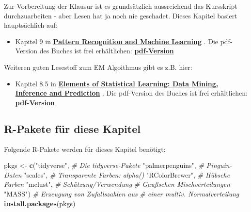 \documentclass[
  ngerman,
]{book}
\newenvironment{Shaded}{\begin{snugshade}}{\end{snugshade}}
\newcommand{\CommentTok}[1]{\textcolor[rgb]{0.56,0.35,0.01}{\textit{#1}}}
\newcommand{\KeywordTok}[1]{\textcolor[rgb]{0.13,0.29,0.53}{\textbf{#1}}}
\newcommand{\NormalTok}[1]{#1}
\newcommand{\StringTok}[1]{\textcolor[rgb]{0.31,0.60,0.02}{#1}}
\providecommand{\tightlist}{%
  \setlength{\itemsep}{0pt}\setlength{\parskip}{0pt}}
\begin{document}
Zur Vorbereitung der Klausur ist es grundsätzlich aussreichend das Kursskript durchzuarbeiten - aber Lesen hat ja noch nie geschadet. Dieses Kapitel basiert hauptsächlich auf:

\begin{itemize}
\tightlist
\item
  Kapitel 9 in \href{https://www.microsoft.com/en-us/research/uploads/prod/2006/01/Bishop-Pattern-Recognition-and-Machine-Learning-2006.pdf}{\textbf{Pattern Recognition and Machine Learning}} \citep{book_Bishop2006}.
  Die pdf-Version des Buches ist frei erhältlichen: \href{https://www.microsoft.com/en-us/research/uploads/prod/2006/01/Bishop-Pattern-Recognition-and-Machine-Learning-2006.pdf}{\textbf{pdf-Version}}
\end{itemize}

Weiteren guten Lesestoff zum EM Algoithmus gibt es z.B. hier:

\begin{itemize}
\tightlist
\item
  Kapitel 8.5 in \href{https://web.stanford.edu/~hastie/ElemStatLearn/}{\textbf{Elements of Statistical Learning: Data Mining, Inference and Prediction}} \citep{Elements}.
  Die pdf-Version des Buches ist frei erhältlichen: \href{https://web.stanford.edu/~hastie/ElemStatLearn/}{\textbf{pdf-Version}}
\end{itemize}

\hypertarget{r-pakete-fuxfcr-diese-kapitel}{%
\subsection*{R-Pakete für diese Kapitel}\label{r-pakete-fuxfcr-diese-kapitel}}

Folgende R-Pakete werden für dieses Kapitel benötigt:

\begin{Shaded}
\begin{Highlighting}[]
\NormalTok{pkgs <-}\StringTok{ }\KeywordTok{c}\NormalTok{(}\StringTok{"tidyverse"}\NormalTok{,      }\CommentTok{# Die tidyverse-Pakete}
          \StringTok{"palmerpenguins"}\NormalTok{, }\CommentTok{# Pinguin-Daten}
          \StringTok{"scales"}\NormalTok{,         }\CommentTok{# Transparente Farben: alpha()}
          \StringTok{"RColorBrewer"}\NormalTok{,   }\CommentTok{# Hübsche Farben}
          \StringTok{"mclust"}\NormalTok{,         }\CommentTok{# Schätzung/Verwendung }
                            \CommentTok{# Gaußschen Mischverteilungen}
          \StringTok{"MASS"}\NormalTok{)           }\CommentTok{# Erzeugung von Zufallszahlen aus }
                            \CommentTok{# einer multiv. Normalverteilung}
\KeywordTok{install.packages}\NormalTok{(pkgs)}
\end{Highlighting}
\end{Shaded}
\end{document}
